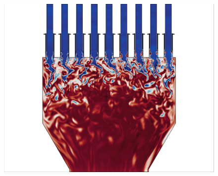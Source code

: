\begin{figure}
{\begin{minipage}{0.32\linewidth}
		\includegraphics[width=0.99\linewidth,trim={0.5em 0.5em 15.0em 0.5em},clip]{Chapters/HPROMResults/Images/nineElem/deim/contours/deim_0p005_temp_z.png}
	\end{minipage}
	}


\end{figure}
